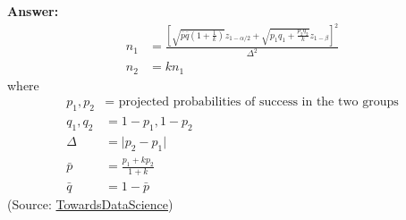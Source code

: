 \documentclass{article}
\newenvironment{QandA}{\begin{enumerate}[label=\arabic*.]}{\end{enumerate}}
\newenvironment{answer}{\par\normalfont \textbf{Answer:}}{}
\begin{document}
\begin{QandA}
\begin{answer}
        \begin{align*}
            n_1 &= \frac{\left[ \sqrt{\bar{p}\bar{q} \left(1 + \frac{1}{k} \right)}z_{1- \alpha/2} + \sqrt{p_1q_1 + \frac{p_2q_2}{k}}z_{1-\beta} \right]^2}{\Delta^2} \\
            n_2 &= k n_1
        \end{align*}
        where 
        \begin{align*}
            p_1, p_2 &= \text{ projected probabilities of success in the two groups} \\
            q_1, q_2 &= 1-p_1, 1-p_2 \\
            \Delta &= \vert p_2 - p_1 \vert \\
            \bar{p} &= \frac{p_1 + k p_2}{1 + k} \\
            \bar{q} &= 1 - \bar{p}
        \end{align*}
        (Source: \href{https://towardsdatascience.com/required-sample-size-for-a-b-testing-6f6608dd330a}{TowardsDataScience})
    \end{answer}


\end{QandA}
\end{document}

